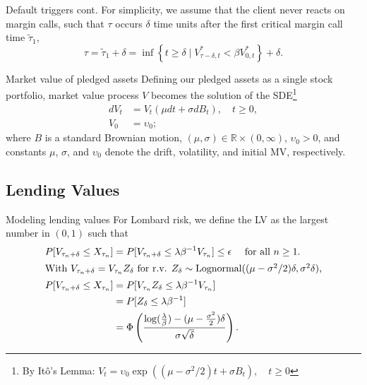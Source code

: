 \documentclass[compress, 10pt, notes]{beamer}  %
\begin{document}
\begin{frame}{Default triggers cont.}
    For simplicity, we assume that the client never reacts on margin calls, such that $\tau$ occurs $\delta$ time units after the first critical margin call time $\widetilde{\tau}_1$,
    \begin{equation*}
        \tau = \widetilde{\tau}_1 + \delta = \inf \left\{ t \geq \delta \mid V^*_{\tau - \delta, t} < \beta V^*_{0,t} \right\} + \delta.
    \end{equation*}
\end{frame}

\begin{frame}{Market value of pledged assets}
    Defining our pledged assets as a single stock portfolio, market value process $V$ becomes the solution of the SDE\footnote{By It\^{o}'s Lemma: $V_t = \upsilon_0 \exp \left( (\mu - \sigma^2 / 2) t+\sigma B_t \right), \quad t \geq 0$}
    \begin{align*}
        dV_t &= V_t \left( \mu dt + \sigma dB_t \right), \quad t \geq 0, \\
        V_0 &= \upsilon_0;
    \end{align*}
    where $B$ is a standard Brownian motion, $(\mu, \sigma) \in \mathbb{R} \times (0, \infty)$, $\upsilon_0 > 0$, and constants $\mu$, $\sigma$, and $\upsilon_0$ denote the drift, volatility, and initial MV, respectively.
\end{frame}

\subsection{Lending Values}
\begin{frame}{Modeling lending values}
    For Lombard risk, we define the LV as the largest number in $(0, 1)$ such that
    \begin{align*}
        P[V_{\tau_n + \delta} \leq X_{\tau_n}] &= P[V_{\tau_n + \delta} \leq \lambda \beta^{-1}V_{\tau_n}] \leq \epsilon \quad \text{ for all } n \geq 1. \\
    \intertext{With $V_{\tau_n + \delta} = V_{\tau_n}Z_\delta$ for r.v. $Z_\delta \sim \text{Lognormal}((\mu - \sigma^2 / 2)\delta, \sigma^2 \delta)$,}
    P[V_{\tau_n + \delta} \leq X_{\tau_n}] &= P[V_{\tau_n} Z_\delta \leq \lambda \beta^{-1}V_{\tau_n}] \\
    &= P[Z_\delta \leq \lambda \beta^{-1}] \\
    &= \Phi \left( \frac{\log (\frac{\lambda}{\beta}) - (\mu - \frac{\sigma^2}{2})\delta}{\sigma \sqrt{\delta}}\right).
    \end{align*}
\end{frame}
\end{document}

